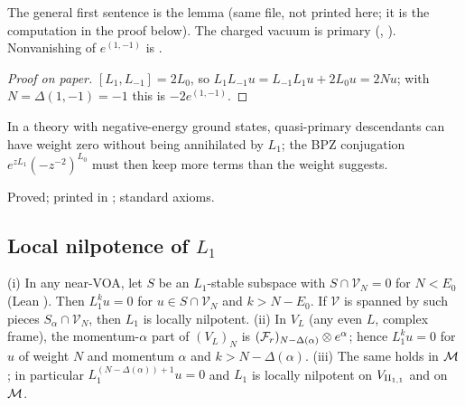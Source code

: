 \begin{dictionary}
The general first sentence is the lemma  (same file, not printed here; it is
the computation in the proof below).  The charged vacuum is primary
(, ).  Nonvanishing of
$e^{(1,-1)}$ is .
\end{dictionary}

\begin{proof}[Proof on paper]
$[L_1,L_{-1}]=2L_0$, so $L_1L_{-1}u=L_{-1}L_1u+2L_0u=2Nu$; with $N=\Delta(1,-1)=-1$ this is $-2e^{(1,-1)}$.
\end{proof}

\begin{physics}
In a theory with negative-energy ground states, quasi-primary descendants can have weight zero without being
annihilated by $L_1$; the BPZ conjugation $e^{zL_1}(-z^{-2})^{L_0}$ must then keep more terms than the weight suggests.
\end{physics}

\begin{status}
Proved; printed in ; standard axioms.
\end{status}

\subsection{Local nilpotence of \texorpdfstring{$L_1$}{L1}}

\begin{theorem}\label{ch17:thm:nilpotence}
(i) In any near-VOA, let $S$ be an $L_1$-stable subspace with $S\cap\mathcal V_N=0$ for $N<E_0$ (Lean ).  Then $L_1^ku=0$ for
$u\in S\cap\mathcal V_N$ and $k>N-E_0$.  If $\mathcal V$ is spanned by such pieces $S_\alpha\cap\mathcal V_N$, then $L_1$ is locally nilpotent.
(ii) In $V_L$ (any even $L$, complex frame), the momentum-$\alpha$ part of $(V_L)_N$ is $(\mathcal{F}_r)_{N-\Delta(\alpha)}\otimes e^\alpha$; hence
$L_1^ku=0$ for $u$ of weight $N$ and momentum $\alpha$ and $k>N-\Delta(\alpha)$.
(iii) The same holds in $\mathcal{M}$; in particular $L_1^{(N-\Delta(\alpha))+1}u=0$ and $L_1$ is locally nilpotent on ${V_{\mathrm{II}_{1,1}}}$ and on
$\mathcal{M}$.
\end{theorem}

